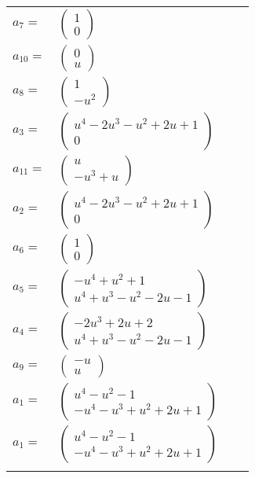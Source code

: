 \documentclass[1p]{elsarticle_modified}
\theoremstyle{definition}
\begin{document}
\begin{tabular}{m{7pt} m{180pt} m{7pt} m{180pt} }
\flushright $a_{7}=$&$\begin{pmatrix}1\\0\end{pmatrix}$ \\
\flushright $a_{10}=$&$\begin{pmatrix}0\\u\end{pmatrix}$ \\
\flushright $a_{8}=$&$\begin{pmatrix}1\\- u^2\end{pmatrix}$ \\
\flushright $a_{3}=$&$\begin{pmatrix}u^4-2 u^3- u^2+2 u+1\\0\end{pmatrix}$ \\
\flushright $a_{11}=$&$\begin{pmatrix}u\\- u^3+u\end{pmatrix}$ \\
\flushright $a_{2}=$&$\begin{pmatrix}u^4-2 u^3- u^2+2 u+1\\0\end{pmatrix}$ \\
\flushright $a_{6}=$&$\begin{pmatrix}1\\0\end{pmatrix}$ \\
\flushright $a_{5}=$&$\begin{pmatrix}- u^4+u^2+1\\u^4+u^3- u^2-2 u-1\end{pmatrix}$ \\
\flushright $a_{4}=$&$\begin{pmatrix}-2 u^3+2 u+2\\u^4+u^3- u^2-2 u-1\end{pmatrix}$ \\
\flushright $a_{9}=$&$\begin{pmatrix}- u\\u\end{pmatrix}$ \\
\flushright $a_{1}=$&$\begin{pmatrix}u^4- u^2-1\\- u^4- u^3+u^2+2 u+1\end{pmatrix}$\\ \flushright $a_{1}=$&$\begin{pmatrix}u^4- u^2-1\\- u^4- u^3+u^2+2 u+1\end{pmatrix}$\\&\end{tabular}
\end{document}
